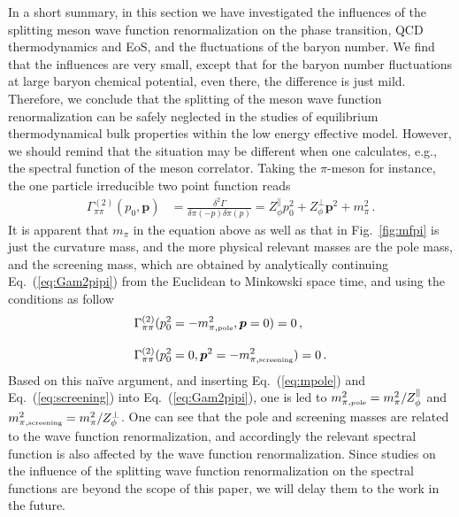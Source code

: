\documentclass[%
reprint,
superscriptaddress,
showpacs,preprintnumbers,
 amsmath,amssymb,
 aps,
prd,
]{revtex4-1}
\def\Fig#1{Fig.~\ref{#1}} \def\Tab#1{Tab.~\ref{#1}}
\def\Eq#1{Eq.~(\ref{#1})}
\begin{document}
In a short summary,  in this section we have investigated the influences of the splitting meson wave function renormalization on the phase transition, QCD thermodynamics and EoS, and the fluctuations of the baryon number. We find that the influences are very small, except that for the baryon number fluctuations at large baryon chemical potential, even there, the difference is just mild. Therefore, we conclude that the splitting of the meson wave function renormalization can be safely neglected in the studies of equilibrium thermodynamical bulk properties within the low energy effective model. However, we should remind that the situation may be different when one calculates, e.g., the spectral function of the meson correlator. Taking the $\pi$-meson for instance, the one particle irreducible two point function reads
\begin{align}
  \Gamma^{(2)}_{\pi \pi}(p_0, \bm{p})&=\frac{\delta^2 \Gamma}{\delta \pi(-p) \delta \pi(p)}= Z_{\phi}^{\parallel} p_0^2+Z_{\phi}^{\perp}\bm{p}^2+m_\pi^2\,.\label{eq:Gam2pipi}
\end{align}
It is apparent that $m_\pi$ in the equation above as well as that in \Fig{fig:mfpi} is just the curvature mass, and the more physical relevant masses are the pole mass, and the screening mass, which are obtained by analytically continuing \Eq{eq:Gam2pipi} from the Euclidean to Minkowski space time, and using the conditions as follow
\begin{align}
  &\Gamma^{(2)}_{\pi \pi}(p_0^2=-m_{\pi,\text{\tiny{pole}}}^2, \bm{p}=0)=0\,, \label{eq:mpole}\\[2ex]
  &\Gamma^{(2)}_{\pi \pi}(p_0^2=0, \bm{p}^2=-m_{\pi,\text{\tiny{screening}}}^2)=0\,. \label{eq:screening}
\end{align}
Based on this na\"ive argument, and inserting \Eq{eq:mpole} and \Eq{eq:screening} into \Eq{eq:Gam2pipi}, one is led to $m_{\pi,\text{\tiny{pole}}}^2=m_\pi^2/Z_{\phi}^{\parallel}$ and $m_{\pi,\text{\tiny{screening}}}^2=m_\pi^2/Z_{\phi}^{\perp}$. One can see that the pole and screening masses are related to the wave function renormalization, and accordingly the relevant spectral function is also affected by the wave function renormalization. Since studies on the influence of the splitting wave function renormalization on the spectral functions are beyond the scope of this paper, we will delay them to the work in the future.
\end{document}
